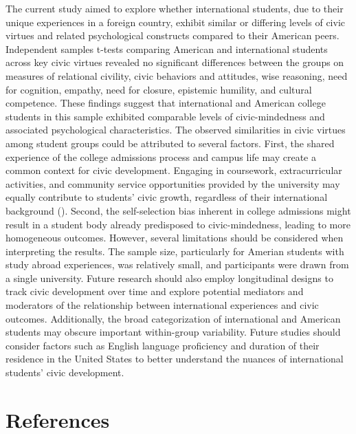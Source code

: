 \documentclass[
  man,
  floatsintext,
  longtable,
  nolmodern,
  notxfonts,
  notimes,
  colorlinks=true,linkcolor=blue,citecolor=blue,urlcolor=blue]{apa7}
\begin{document}
The current study aimed to explore whether international students, due
to their unique experiences in a foreign country, exhibit similar or
differing levels of civic virtues and related psychological constructs
compared to their American peers. Independent samples t-tests comparing
American and international students across key civic virtues revealed no
significant differences between the groups on measures of relational
civility, civic behaviors and attitudes, wise reasoning, need for
cognition, empathy, need for closure, epistemic humility, and cultural
competence. These findings suggest that international and American
college students in this sample exhibited comparable levels of
civic-mindedness and associated psychological characteristics. The
observed similarities in civic virtues among student groups could be
attributed to several factors. First, the shared experience of the
college admissions process and campus life may create a common context
for civic development. Engaging in coursework, extracurricular
activities, and community service opportunities provided by the
university may equally contribute to students' civic growth, regardless
of their international background
(). Second, the self-selection bias inherent in college admissions
might result in a student body already predisposed to civic-mindedness,
leading to more homogeneous outcomes. However, several limitations
should be considered when interpreting the results. The sample size,
particularly for Amerian students with study abroad experiences, was
relatively small, and participants were drawn from a single university.
Future research should also employ longitudinal designs to track civic
development over time and explore potential mediators and moderators of
the relationship between international experiences and civic outcomes.
Additionally, the broad categorization of international and American
students may obscure important within-group variability. Future studies
should consider factors such as English language proficiency and
duration of their residence in the United States to better understand
the nuances of international students' civic development.

\clearpage

\section{References}\label{references}
\end{document}
